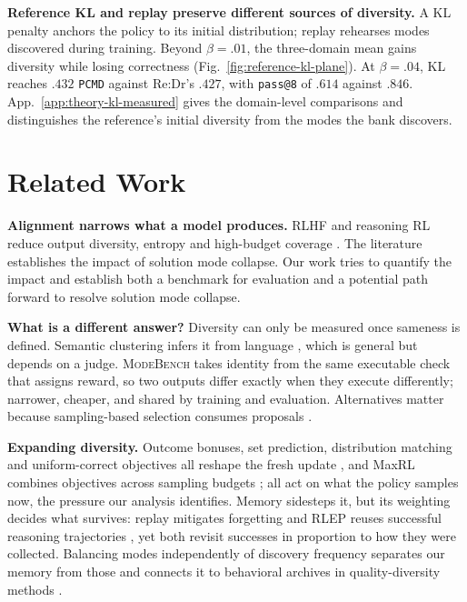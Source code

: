 \documentclass{article}
\newcommand{\1}{\mathbf 1}
\newcommand{\mb}{\textsc{ModeBench}}
\newcommand{\pmd}{\texttt{PCMD}}
\theoremstyle{remark}
\theoremstyle{definition}
\theoremstyle{plain}
\begin{document}
\textbf{Reference KL and replay preserve different sources of diversity.}
A KL penalty anchors the policy to its initial distribution; replay rehearses modes discovered during training. Beyond $\beta=.01$, the three-domain mean gains diversity while losing correctness (Fig.~\ref{fig:reference-kl-plane}). At $\beta=.04$, KL reaches $.432$ \pmd{} against Re:Dr's $.427$, with \texttt{pass@8} of $.614$ against $.846$. App.~\ref{app:theory-kl-measured} gives the domain-level comparisons and distinguishes the reference's initial diversity from the modes the bank discovers.

\section{Related Work}
\label{sec:related}

\textbf{Alignment narrows what a model produces.} RLHF and reasoning RL reduce
output diversity, entropy and high-budget coverage
\citep{kirk2024understanding,dang2025diversity,cui2025entropy,yue2025rlvrlimit}.
The literature establishes the impact of solution mode collapse. Our work tries to quantify the impact and establish both a benchmark for evaluation and a potential path forward to resolve solution mode collapse.

\textbf{What is a different answer?}
Diversity can only be measured once sameness is defined.
Semantic clustering infers it from language \citep{farquhar2024detecting}, which is general but depends on a judge.
\mb{} takes identity from the same executable check that assigns reward, so two outputs differ exactly when they execute differently; narrower, cheaper, and shared by training and evaluation.
Alternatives matter because sampling-based selection consumes proposals
\citep{brown2024monkeys,snell2024testtime,cobbe2021training,lightman2023lets}.

\textbf{Expanding diversity.}
Outcome bonuses, set prediction, distribution matching and uniform-correct objectives all reshape the fresh update \citep{song2025outcome,chen2025passktraining,li2025divergence,li2026setpo,li2026distribution,lochab2026ucpo}, and MaxRL combines objectives across sampling budgets \citep{tajwar2026maxrl};
all act on what the policy samples now, the pressure our analysis
identifies.
Memory sidesteps it, but its weighting decides what survives: replay mitigates forgetting \citep{lin1992selfimproving,rolnick2019replay} and RLEP reuses successful reasoning trajectories \citep{zhang2025rlep}, yet both revisit successes in proportion to how they were collected.
Balancing modes independently of discovery frequency separates our memory from those and connects it to behavioral archives in quality-diversity methods \citep{mouret2015illuminating,ecoffet2021return}.
\end{document}
